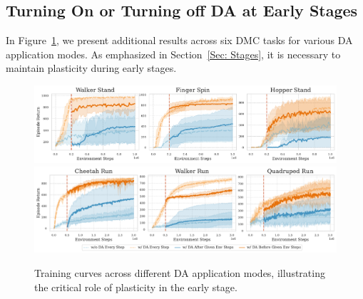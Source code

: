 \subsection{Turning On or Turning off DA at Early Stages}
\label{Appendix: Turning DA}
In Figure~\ref{appendix_fig:turn_on_and_off_DA}, we present additional results across six DMC tasks for various DA application modes. As emphasized in Section~\ref{Sec: Stages}, it is necessary to maintain plasticity during early stages.
\begin{figure}[ht]
  \centering
  \includegraphics[width=\textwidth]{Figures/5Appendix/recover_WFH.pdf}
  \includegraphics[width=\textwidth]{Figures/5Appendix/recover.pdf}
  \vspace{-\baselineskip}
  \caption{Training curves across different DA application modes, illustrating the critical role of plasticity in the early stage.}

\label{appendix_fig:turn_on_and_off_DA}
\end{figure}

\newpage
